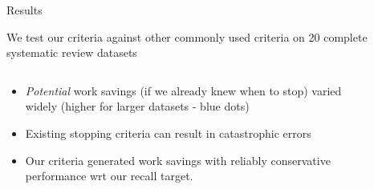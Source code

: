 \documentclass[9pt,aspectratio=169]{beamer}
\begin{document}
\begin{frame}{Results}

We test our criteria against other commonly used criteria on 20 complete systematic review datasets

\begin{columns}
	\begin{column}{0.618\linewidth}
		\begin{itemize}
			\item<1-> \textit{Potential} work savings (if we already knew when to stop) varied widely (higher for larger datasets - blue dots)
			\item<2-> Existing stopping criteria can result in catastrophic errors
			\item<4-> Our criteria generated work savings with reliably conservative performance wrt our recall target.
		\end{itemize}
	\end{column}
	\begin{column}{0.382\linewidth}
		\begin{figure}

\end{figure}
\end{column}
\end{columns}
\end{frame}
\end{document}
